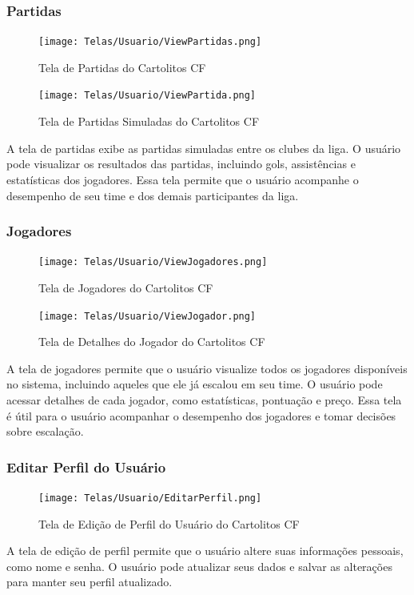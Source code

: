 \documentclass[12pt]{article}
\begin{document}
\subsubsection{Partidas}
\label{sec:partidas}
\begin{figure}[H]
  \centering
  \texttt{[image: Telas/Usuario/ViewPartidas.png]}
  \caption{Tela de Partidas do Cartolitos CF}
  \label{fig:partidas}
\end{figure}

\begin{figure}[H]
  \centering
  \texttt{[image: Telas/Usuario/ViewPartida.png]}
  \caption{Tela de Partidas Simuladas do Cartolitos CF}
  \label{fig:partidas_simuladas}
\end{figure}
A tela de partidas exibe as partidas simuladas entre os clubes da liga. O usuário pode visualizar os resultados das partidas, incluindo gols, assistências e estatísticas dos jogadores. Essa tela permite que o usuário acompanhe o desempenho de seu time e dos demais participantes da liga.

\subsubsection{Jogadores}
\label{sec:jogadores}
\begin{figure}[H]
  \centering
  \texttt{[image: Telas/Usuario/ViewJogadores.png]}
  \caption{Tela de Jogadores do Cartolitos CF}
  \label{fig:jogadores}
\end{figure}

\begin{figure}[H]
  \centering
  \texttt{[image: Telas/Usuario/ViewJogador.png]}
  \caption{Tela de Detalhes do Jogador do Cartolitos CF}
  \label{fig:jogador_detalhes}
\end{figure}
A tela de jogadores permite que o usuário visualize todos os jogadores disponíveis no sistema, incluindo aqueles que ele já escalou em seu time. O usuário pode acessar detalhes de cada jogador, como estatísticas, pontuação e preço. Essa tela é útil para o usuário acompanhar o desempenho dos jogadores e tomar decisões sobre escalação.

\subsubsection{Editar Perfil do Usuário}
\label{sec:perfil_usuario}
\begin{figure}[H]
  \centering
  \texttt{[image: Telas/Usuario/EditarPerfil.png]}
  \caption{Tela de Edição de Perfil do Usuário do Cartolitos CF}
  \label{fig:editar_perfil}
\end{figure}
A tela de edição de perfil permite que o usuário altere suas informações pessoais, como nome e senha. O usuário pode atualizar seus dados e salvar as alterações para manter seu perfil atualizado.
\end{document}
